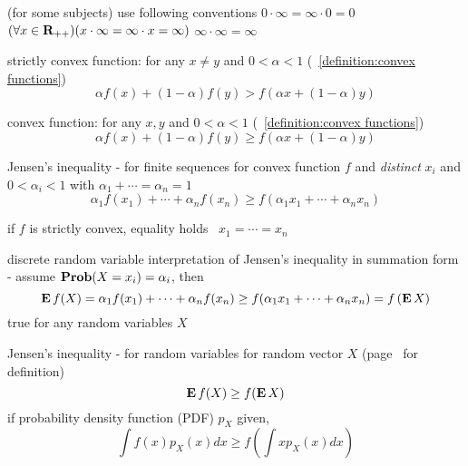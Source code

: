 \documentclass[17pt,landscape]{foils}
\begin{document}
\vfill
{}
\bit
\item
(for some subjects) use following conventions
\bit
\vitem
$0\cdot \infty = \infty \cdot 0 = 0$
\vitem
$(\forall x\in\mbox{\bf R}_{++})(x\cdot \infty = \infty \cdot x = \infty)$
\vitem
$\infty \cdot \infty = \infty$
\eit
\eit
\vfillfi
{}
\nocite{HLP:52}
\bit
\item
strictly convex function: for any $x\neq y$ and $0< \alpha <1$
(~\ref{definition:convex functions})
\[
\alpha f(x) + (1-\alpha) f(y) > f(\alpha x + (1-\alpha) y)
\]
\item convex function: for any $x, y$ and $0< \alpha <1$
(~\ref{definition:convex functions})
\[
\alpha f(x) + (1-\alpha) f(y) \geq f(\alpha x + (1-\alpha) y)
\]
\eit
\begin{myinequality}{Jensen's inequality - for finite sequences}
for convex function $f$ and \emph{distinct} $x_i$
and $0< \alpha_i <1$ with $\alpha_1 + \cdots = \alpha_n=1$
\[
\alpha_1 f(x_1) + \cdots + \alpha_n f(x_n) \geq f(\alpha_1 x_1 + \cdots + \alpha_n x_n)
\]
\bit
\item
if $f$ is strictly convex, equality holds \iaoi\ $x_1=\cdots=x_n$
\eit
\end{myinequality}
\bit
\item
discrete random variable interpretation of Jensen's inequality in summation form - assume $\mathop{\bf Prob}(X=x_i) = \alpha_i$, then
\[
\mathop{\bf E{}} f(X)
=
\alpha_1 f(x_1) + \cdots + \alpha_n f(x_n)
\geq
f(\alpha_1 x_1 + \cdots + \alpha_n x_n)
=
f\left(\mathop{\bf E{}} X\right)
\]
\vitem true for any random variables $X$
\eit
\vfill
\begin{myinequality}{Jensen's inequality - for random variables}
for random vector $X$ (page~\pageref{page:random-variables} for definition)
\[
\mathop{\bf E{}} f(X) \geq f(\mathop{\bf E{}} X)
\]
if probability density function (PDF) $p_X$ given,
\[
\int f(x) p_X(x) dx \geq f\left(\int x p_X(x) dx\right)
\]
\end{myinequality}
\end{document}
